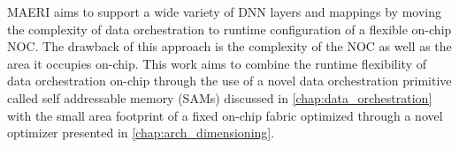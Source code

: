MAERI aims to support a wide variety of DNN layers and mappings by moving the
complexity of data orchestration to runtime configuration of a flexible on-chip
NOC. The drawback of this approach is the complexity of the NOC as well as the
area it occupies on-chip. This work aims to combine the runtime flexibility of
data orchestration on-chip through the use of a novel data orchestration
primitive called self addressable memory (SAMs) discussed in
\autoref{chap:data_orchestration} with the small area footprint of a fixed
on-chip fabric optimized through a novel optimizer presented in
\autoref{chap:arch_dimensioning}. 





